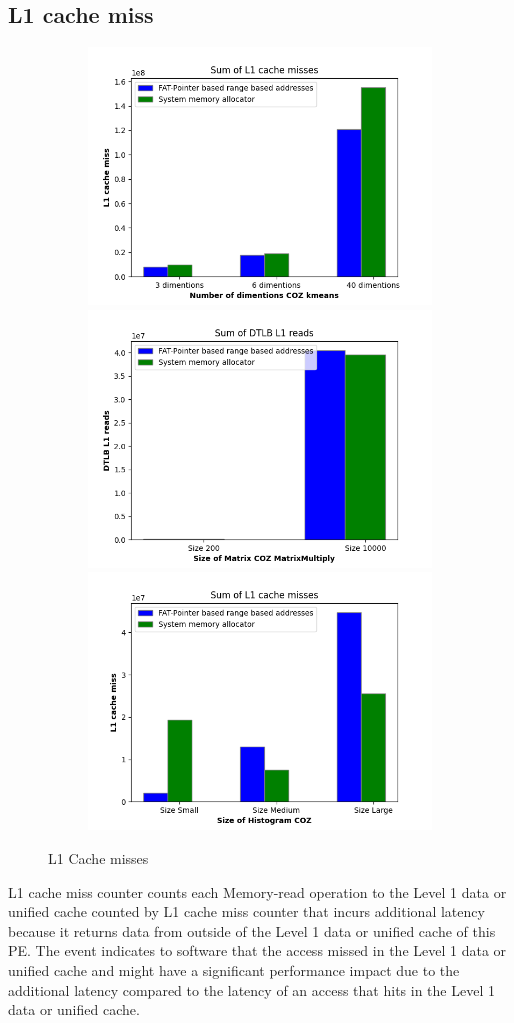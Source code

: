 \subsection{L1 cache miss}
\begin{figure}
  \begin{subfigure}{\linewidth}
    \includegraphics[width=.5\linewidth]{l1-miss-kmeans.png}\hfill
    \includegraphics[width=.5\linewidth]{l1-miss-matrixmultiply.png}\hfill
    \includegraphics[width=.5\linewidth]{l1-miss-histogram.png}
\end{subfigure}
\caption{L1 Cache misses}
\label{fig:L1CacheMiss}
\end{figure}
L1 cache miss counter counts each Memory-read operation to the Level 1 data or unified cache counted by L1 cache miss counter that incurs additional latency because it returns data from outside of the Level 1 data or unified cache of this PE.
The event indicates to software that the access missed in the Level 1 data or unified cache and might have a significant performance impact due to the additional latency compared to the latency of an access that hits in the Level 1 data or unified cache.
\newline

